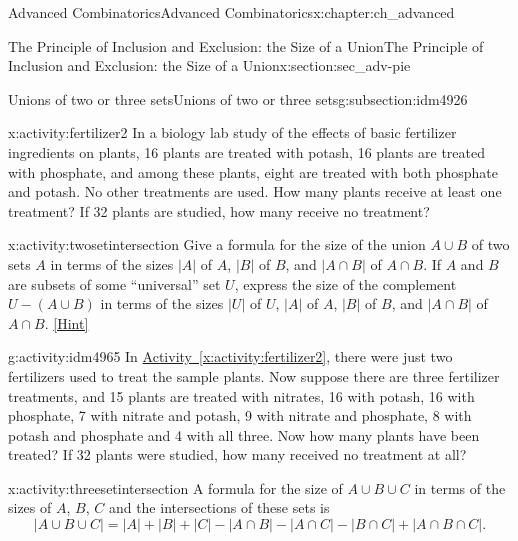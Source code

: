 \documentclass[oneside,10pt,]{book}
\numberwithin{equation}{chapter}
\begin{document}
\begin{chapterptx}{Advanced Combinatorics}{}{Advanced Combinatorics}{}{}{x:chapter:ch_advanced}
\begin{sectionptx}{The Principle of Inclusion and Exclusion: the Size of a Union}{}{The Principle of Inclusion and Exclusion: the Size of a Union}{}{}{x:section:sec_adv-pie}
\begin{introduction}{}
\end{introduction}%
%
%
\typeout{************************************************}
\typeout{************************************************}
%
\begin{subsectionptx}{Unions of two or three sets}{}{Unions of two or three sets}{}{}{g:subsection:idm4926}
\begin{activity}{}{x:activity:fertilizer2}%
In a biology lab study of the effects of basic fertilizer ingredients on plants, 16 plants are treated with potash, 16 plants are treated with phosphate, and among these plants, eight are treated with both phosphate and potash. No other treatments are used. How many plants receive at least one treatment? If 32 plants are studied, how many receive no treatment?%
\end{activity}
\begin{activity}{}{x:activity:twosetintersection}%
Give a formula for the size of the union \(A\cup B\) of two sets \(A\) in terms of the sizes \(|A|\) of \(A\), \(|B|\) of \(B\), and \(|A\cap B|\) of \(A\cap B\). If \(A\) and \(B\) are subsets of some ``universal'' set \(U\), express the size of the complement \(U-(A\cup B)\) in terms of the sizes \(|U|\) of \(U\), \(|A|\) of \(A\), \(|B|\) of \(B\), and \(|A\cap B|\) of \(A\cap B\).%
\space\hspace*{0pt}\hfill{\tiny\hyperlink{g:hint:idm4958-back}{[Hint]}}\end{activity}
\begin{activity}{}{g:activity:idm4965}%
In \hyperref[x:activity:fertilizer2]{Activity~\ref{x:activity:fertilizer2}}, there were just two fertilizers used to treat the sample plants. Now suppose there are three fertilizer treatments, and 15 plants are treated with nitrates, 16 with potash, 16 with phosphate, 7 with nitrate and potash, 9 with nitrate and phosphate, 8 with potash and phosphate and 4 with all three. Now how many plants have been treated? If 32 plants were studied, how many received no treatment at all?%
\end{activity}
\begin{activity}{}{x:activity:threesetintersection}%
A formula for the size of \(A\cup B\cup C\) in terms of the sizes of \(A\), \(B\), \(C\) and the intersections of these sets is%
\begin{equation*}
|A\cup B\cup C|=|A|+|B|+|C|-|A\cap B|- |A\cap C| - |B\cap
C| +|A\cap B\cap C|\text{.}
\end{equation*}
%
\begin{sidebyside}{2}{0}{0}{0.1}%

\end{sidebyside}
\end{activity}
\end{subsectionptx}
\end{sectionptx}
\end{chapterptx}
\end{document}

